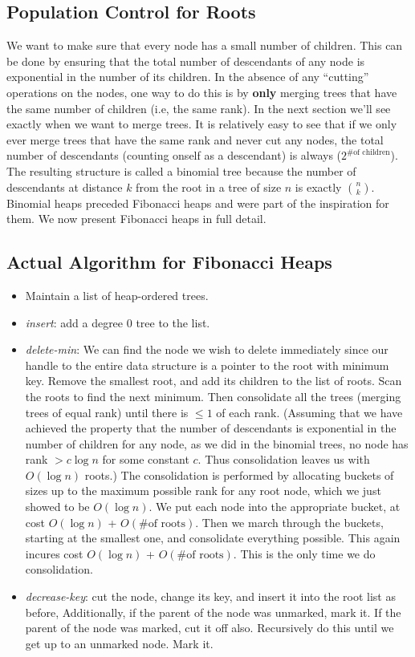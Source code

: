 \documentclass{article}
\begin{document}
\subsection{Population Control for Roots}

We want to make sure that every node has a small number of
children. This can be done by
ensuring that the total number
of descendants of any node is exponential in
the number of its children. In the absence of any ``cutting'' operations
on the nodes,
one way to do this is by \textbf{only}
merging trees that have the same number of children (i.e, the same
rank). In the next section we'll see exactly when we want to merge trees.
It is relatively easy to see that if we only ever merge trees
that have the same rank and never cut any nodes, 
the total number of descendants (counting
onself as a descendant) is always
($2^{ \mbox{\# of children}}$). The resulting structure is called a binomial
tree
because the number of descendants at distance $k$ from the root in a
tree of size $n$ is
exactly $n \choose k$. Binomial heaps preceded Fibonacci heaps and were
part of the inspiration for them. We now present Fibonacci heaps in full
detail.

\subsection{Actual Algorithm for Fibonacci Heaps}

\begin{itemize}
\item Maintain a list of heap-ordered trees.
\item \emph{insert}: add a degree 0 tree to the list.
\item \emph{delete-min}: We can find the node we wish to delete
immediately since our handle to the entire data structure is a pointer
to the root with minimum key. Remove the smallest root, and add its children
to the list of roots. Scan the roots to find the next minimum. Then
consolidate all the trees (merging trees of equal rank) until there is
$\leq 1$ of each rank. (Assuming that we have achieved the property that
the number of descendants is exponential in the number of children
for any node, as we did in the
binomial trees, no node has rank
$> c \log n$ for some constant $c$. Thus consolidation leaves us with
$O(\log n)$ roots.) The consolidation is performed by allocating buckets
of sizes up to the maximum possible rank for any root node, which we
just showed to be $O(\log n)$. We put each node into the appropriate
bucket, at cost $O(\log n)$ + $O(\mbox{\# of roots})$. Then we march
through the buckets, starting at the smallest one, and consolidate
everything possible. This again incures cost $O(\log n)$ + $O(\mbox{\#
of roots})$. This is the only time we do consolidation.
\item \emph{decrease-key}: cut the node, change its key, and insert it into
the root list as before, Additionally, if the parent of the node was
unmarked, mark it. If the parent of the node was marked, cut it off
also. Recursively do this until we get up to an unmarked node. Mark it.

\end{itemize}
\end{document}
